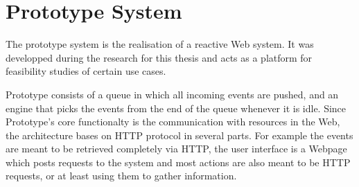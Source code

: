 
\chapter{Prototype System}


%

% 


The prototype system is the realisation of a reactive Web system.
It was developped during the research for this thesis and acts as a platform for feasibility studies of certain use cases.



Prototype consists of a queue in which all incoming events are pushed, and an engine that picks the events from the end of the queue whenever it is idle.
Since Prototype's core functionalty is the communication with resources in the Web, the architecture bases on HTTP protocol in several parts.
For example the events are meant to be retrieved completely via HTTP, the user interface is a Webpage which posts requests to the system and most actions are also meant to be HTTP requests, or at least using them to gather information.

